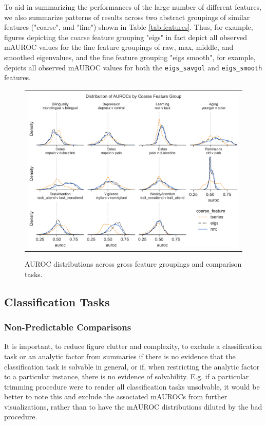 \documentclass[12pt]{spieman}  %
\newcommand{\code}[1]{\small\texttt{#1}\normalsize}
\begin{document}
\begin{spacing}{2}
To aid in summarizing the performances of the large number of different
features, we also summarize patterns of results across two abstract groupings
of similar features ("coarse", and "fine") shown in Table \ref{tab:features}.
Thus, for example, figures depicting the coarse feature grouping "eigs" in fact
depict all observed mAUROC values for the fine feature groupings of raw,
max, middle, and smoothed eigenvalues, and the fine feature grouping "eigs
smooth", for example, depicts all observed mAUROC values for both the
\code{eigs\_savgol} and \code{eigs\_smooth} features.


\begin{figure}
\begin{center}
\begin{tabular}{c}
\includegraphics[width=6.5in]{coarse_feature_overall_by_subgroup.png}
\end{tabular}
\end{center}
\caption
{ \label{fig:main-results}
AUROC distributions across gross feature groupings and comparison tasks.}
\end{figure}

\subsection{Classification Tasks}

\subsubsection{Non-Predictable Comparisons}

It is important, to reduce figure clutter and complexity, to exclude a
classification task or an analytic factor from summaries if there is no
evidence that the classification task is solvable in general, or if, when
restricting the analytic factor to a particular instance, there is no evidence
of solvability. E.g. if a particular trimming procedure were to render all
classification tasks unsolvable, it would be better to note this and exclude
the associated mAUROCs from further visualizations, rather than to have the
mAUROC distributions diluted by the bad procedure.


\end{spacing}
\end{document}
